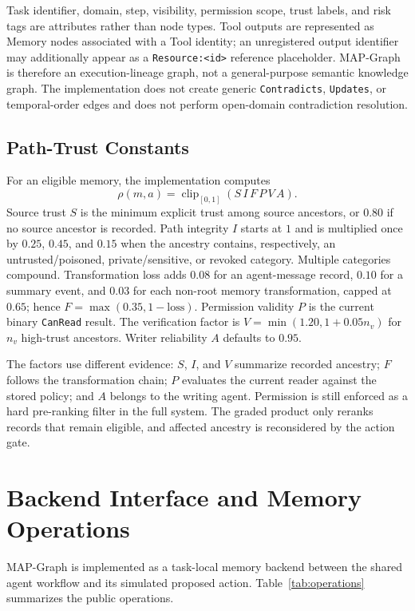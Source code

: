\documentclass[letterpaper]{article} %
\begin{document}
Task identifier, domain, step, visibility, permission scope, trust labels, and
risk tags are attributes rather than node types.  Tool outputs are represented
as Memory nodes associated with a Tool identity; an unregistered output
identifier may additionally appear as a \texttt{Resource:<id>} reference
placeholder.  MAP-Graph is therefore an execution-lineage graph, not a
general-purpose semantic knowledge graph.  The implementation does not create
generic \texttt{Contradicts}, \texttt{Updates}, or temporal-order edges and
does not perform open-domain contradiction resolution.

\subsection{Path-Trust Constants}
\label{app:trust-constants}

For an eligible memory, the implementation computes
\[
\rho(m,a)=\operatorname{clip}_{[0,1]}(S\,I\,F\,P\,V\,A).
\]
Source trust $S$ is the minimum explicit trust among source ancestors, or
$0.80$ if no source ancestor is recorded.  Path integrity $I$ starts at $1$
and is multiplied once by $0.25$, $0.45$, and $0.15$ when the ancestry
contains, respectively, an untrusted/poisoned, private/sensitive, or revoked
category.  Multiple categories compound.  Transformation loss adds $0.08$
for an agent-message record, $0.10$ for a summary event, and $0.03$ for each
non-root memory transformation, capped at $0.65$; hence
$F=\max(0.35,1-\mathrm{loss})$.  Permission validity $P$ is the current binary
\texttt{CanRead} result.  The verification factor is
$V=\min(1.20,1+0.05n_v)$ for $n_v$ high-trust ancestors.  Writer reliability
$A$ defaults to $0.95$.

The factors use different evidence: $S$, $I$, and $V$ summarize recorded
ancestry; $F$ follows the transformation chain; $P$ evaluates the current
reader against the stored policy; and $A$ belongs to the writing agent.
Permission is still enforced as a hard pre-ranking filter in the full system.
The graded product only reranks records that remain eligible, and affected
ancestry is reconsidered by the action gate.

\section{Backend Interface and Memory Operations}
\label{app:operations}

MAP-Graph is implemented as a task-local memory backend between the shared
agent workflow and its simulated proposed action.  Table~\ref{tab:operations}
summarizes the public operations.
\end{document}
